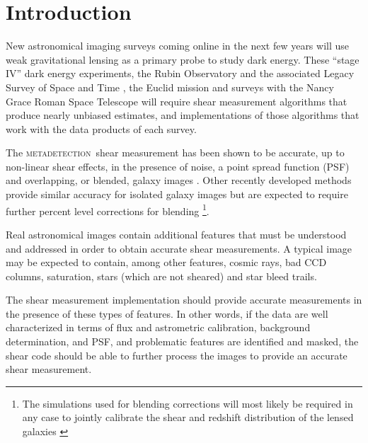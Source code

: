 \documentclass[twocolumn,twocolappendix,astrosym]{openjournal}
\newcommand{\mdet}{\textsc{metadetection}}
\begin{document}
\section{Introduction} \label{sec:intro}

New astronomical imaging surveys coming online in the next few years will use
weak gravitational lensing as a primary probe to study dark energy.  These
``stage IV'' dark energy experiments, the Rubin Observatory and the associated
Legacy Survey of Space and Time \citep[LSST,][]{IvezicLSST2008}, the
Euclid mission \citep{Euclid2011} and surveys with the Nancy Grace Roman Space
Telescope \citep{Roman2015} will require shear measurement algorithms that
produce nearly unbiased estimates, and implementations of those algorithms that
work with the data products of each survey.

The \mdet\ shear measurement has been shown to be accurate, up to non-linear
shear effects, in the presence of noise, a point spread function (PSF) and
overlapping, or blended, galaxy images
\citep{mdet20,HoekstraMdet2021a,HoekstraMdet2021b}.  Other recently developed
methods provide similar accuracy for isolated galaxy images \citep{BernBFD2016,
LiFPFSBlending2022} but are expected to require further percent level
corrections for blending \citep{mdet20,LiFPFSBlending2022}\footnote{The
simulations used for blending corrections will most likely be required in any
case to jointly calibrate the shear and redshift distribution of the lensed
galaxies \citep{MacCrann2022,LiNofz2022}}.

Real astronomical images contain additional features that must be understood
and addressed in order to obtain accurate shear measurements.  A typical image
may be expected to contain, among other features, cosmic rays, bad CCD columns,
saturation, stars (which are not sheared) and star bleed trails.

The shear measurement implementation should provide accurate measurements in
the presence of these types of features.  In other words, if the data are well
characterized in terms of flux and astrometric calibration, background
determination, and PSF, and problematic features are identified and masked, the
shear code should be able to further process the images to provide an accurate
shear measurement.
\end{document}
